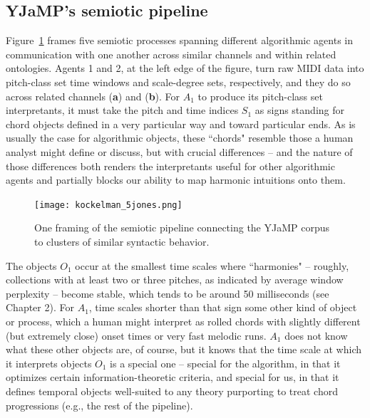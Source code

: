 \subsection{YJaMP's semiotic pipeline}
Figure~\ref{k_j} frames five semiotic processes spanning different algorithmic agents in communication with one another across similar channels and within related ontologies.  Agents 1 and 2, at the left edge of the figure, turn raw MIDI data into pitch-class set time windows and scale-degree sets, respectively, and they do so across related channels (\textbf{a}) and (\textbf{b}).  For $A_1$ to produce its pitch-class set interpretants, it must take the pitch and time indices $S_1$ as signs standing for chord objects defined in a very particular way and toward particular ends.  As is usually the case for algorithmic objects, these ``chords" resemble those a human analyst might define or discuss, but with crucial differences -- and the nature of those differences both renders the interpretants useful for other algorithmic agents and partially blocks our ability to map harmonic intuitions onto them.
\begin{landscape}
\begin{figure}
	\centering
	\caption{One framing of the semiotic pipeline connecting the YJaMP corpus to clusters of similar syntactic behavior.}%
	\label{k_j}
	\texttt{[image: kockelman\_5jones.png]}
\end{figure}
\end{landscape}


The objects $O_1$ occur at the smallest time scales where ``harmonies" -- roughly, collections with at least two or three pitches, as indicated by average window perplexity -- become stable, which tends to be around 50 milliseconds (see Chapter 2).  For $A_1$, time scales shorter than that sign some other kind of object or process, which a human might interpret as rolled chords with slightly different (but extremely close) onset times or very fast melodic runs.  $A_1$ does not know what these other objects are, of course, but it knows that the time scale at which it interprets objects $O_1$ is a special one -- special for the algorithm, in that it optimizes certain information-theoretic criteria, and special for us, in that it defines temporal objects well-suited to any theory purporting to treat chord progressions (e.g., the rest of the pipeline).

